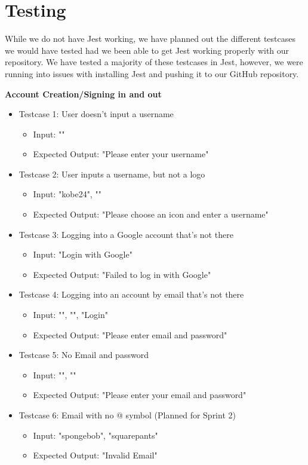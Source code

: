 \section{Testing}
While we do not have Jest working, we have planned out the different testcases we would have tested had we been able to get Jest working properly with our repository. We have tested a majority of these testcases in Jest, however, we were running into issues with installing Jest and pushing it to our GitHub repository.

\noindent
\textbf{Account Creation/Signing in and out}
\begin{itemize}
    \item Testcase 1: User doesn't input a username
    \begin{itemize}
        \item Input: ""
        \item Expected Output: "Please enter your username"
    \end{itemize}

    \item Testcase 2: User inputs a username, but not a logo
    \begin{itemize}
        \item Input: "kobe24", ""
        \item Expected Output: "Please choose an icon and enter a username"
    \end{itemize}

    \item Testcase 3: Logging into a Google account that's not there
    \begin{itemize}
        \item Input: "Login with Google"
        \item Expected Output: "Failed to log in with Google"
    \end{itemize}

    \item Testcase 4: Logging into an account by email that's not there
    \begin{itemize}
        \item Input: "", "", "Login"
        \item Expected Output: "Please enter email and password"
    \end{itemize}

    \item Testcase 5: No Email and password
    \begin{itemize}
        \item Input: "", ""
        \item Expected Output: "Please enter your email and password"
    \end{itemize}

    \item Testcase 6: Email with no @ symbol (Planned for Sprint 2)
    \begin{itemize}
        \item Input: "spongebob", "squarepants"
        \item Expected Output: "Invalid Email"
    \end{itemize}
\end{itemize}


